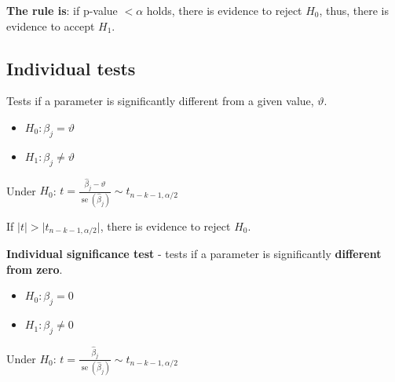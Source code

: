 \documentclass[10pt, a4paper, landscape]{article}
\DeclareMathOperator{\se}{se}
\begin{document}
\begin{multicols}{3}
\begin{multicols}{2}
\columnbreak


\end{multicols}

\textbf{The rule is}: if p-value \( < \alpha \) holds, there is evidence to reject \( H_{0} \), thus, there is evidence to accept \( H_{1} \).

\columnbreak

\subsection*{Individual tests}

Tests if a parameter is significantly different from a given value, \( \vartheta \).

\begin{itemize}[leftmargin=*]
	\item \( H_{0}: \beta_{j} = \vartheta \)
	\item \( H_{1}: \beta_{j} \neq \vartheta \)
\end{itemize}

\begin{center}
	Under \( H_{0} \): \quad \( t = \frac{\hat{\beta}_{j} - \vartheta}{\se(\hat{\beta}_{j})} \sim t_{n - k - 1, \alpha / 2} \)
\end{center}

If \( \lvert t \rvert > \lvert t_{n - k - 1, \alpha / 2} \rvert \), there is evidence to reject \( H_{0} \).

\textbf{Individual significance test} - tests if a parameter is significantly \textbf{different from zero}.

\begin{itemize}[leftmargin=*]
	\item \( H_{0}: \beta_{j} = 0 \)
	\item \( H_{1}: \beta_{j} \neq 0 \)
\end{itemize}

\begin{center}
	Under \( H_{0} \): \quad \( t = \frac{\hat{\beta}_{j}}{\se(\hat{\beta}_{j})} \sim t_{n - k - 1, \alpha / 2} \)
\end{center}


\end{multicols}
\end{document}
